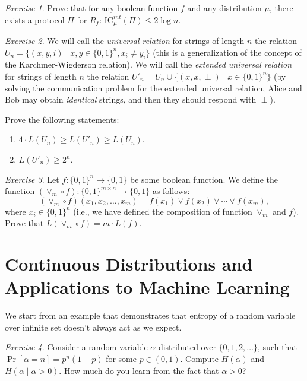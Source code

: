 \documentclass[12pt,sans]{article}
\newcommand{\bits}{\{0,1\}}
\newcommand{\seqn}[2]{{#1}_1,{#1}_2,\dotsc,{#1}_{#2}}
\newcommand{\IC}{\mathrm{IC}}
\theoremstyle{definition}
\theoremstyle{plain}
\theoremstyle{remark}
\newtheorem{exercise}{Exercise}[section]
\begin{document}
\begin{exercise}
    Prove that for any boolean function $f$ and any distribution $\mu$,
    there exists a protocol $\Pi$ for $R_f$: $\IC^{int}_\mu(\Pi) \le 2\log n$.
\end{exercise}
\begin{exercise}
    We will call the \emph{universal relation} for strings of length $n$ the relation
    $U_n = \{(x,y,i) \mid x,y \in \bits^n, x_i \neq y_i\}$ (this is a generalization of the concept
    of the Karchmer-Wigderson relation). We will call the \emph{extended universal relation} for strings of length $n$ the relation
    $U'_n = U_n \cup \{(x,x,\perp) \mid x \in \bits^n\}$
    (by solving the communication problem for the extended universal relation,
    Alice and Bob may obtain \emph{identical} strings, and then they should respond with $\perp$).

    Prove the following statements:
    \begin{enumerate}
        \item $4 \cdot L(U_n) \ge L(U'_n) \ge L(U_n)$.
        \item $L(U'_n) \ge 2^n$.
    \end{enumerate}
\end{exercise}
\begin{exercise}
    Let $f:\bits^n \to \bits$ be some boolean function. We define the function $(\lor_m \circ f): \bits^{m \times n} \to \bits$
    as follows: $$(\lor_m \circ f)(\seqn{x}{m}) = f(x_1) \lor f(x_2) \lor \dotsb \lor f(x_m),$$
    where $x_i \in \bits^n$ (i.e., we have defined the composition of function $\lor_m$ and $f$). Prove that $L(\lor_m \circ f) =
    m \cdot L(f)$.
\end{exercise}


\section{Continuous Distributions and Applications to Machine Learning}
We start from an example that demonstrates that entropy of a random variable over infinite set doesn't always act as we expect.
\begin{exercise}
    Consider a random variable $\alpha$ distributed over $\{0,1,2,\dotsc\}$,
    such that $\Pr[\alpha = n] = p^n (1-p)$ for some $p\in(0,1)$.
    Compute $H(\alpha)$ and $H(\alpha\mid \alpha>0)$.
    How much do you learn from the fact that $\alpha > 0$?
\end{exercise}
\end{document}

